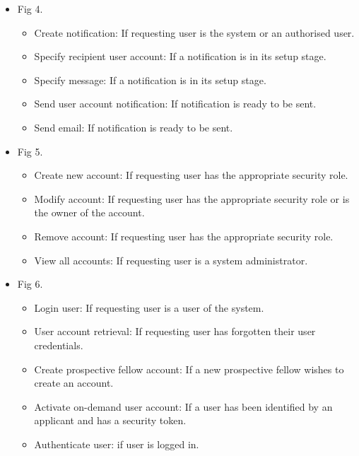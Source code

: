 \documentclass[12pt]{article}
\begin{document}
\begin{itemize}
	\item Fig 4.
		\begin{itemize}
			\item Create notification: If requesting user is the system or an authorised user.
			\item Specify recipient user account: If a notification is in its setup stage.				
			\item Specify message: If a notification is in its setup stage.
			\item Send user account notification: If notification is ready to be sent.
			\item Send email: If notification is ready to be sent.	
		\end{itemize}
	
	\item Fig 5.
		\begin{itemize}
			\item Create new account: If requesting user has the appropriate security role.
			\item Modify account: If requesting user has the appropriate security role or is the owner of the account.				
			\item Remove account: If requesting user has the appropriate security role.	
			\item View all accounts: If requesting user is a system administrator.					
		\end{itemize}
	
	\item Fig 6.
		\begin{itemize}
			\item Login user: If requesting user is a user of the system.
			\item User account retrieval: If requesting user has forgotten their user credentials.				
			\item Create prospective fellow account: If a new prospective fellow wishes to create an account.	
			\item Activate on-demand user account: If a user has been identified by an applicant and has a security token.
			\item Authenticate user: if user is logged in.						
		\end{itemize}
	

\end{itemize}
\end{document}
